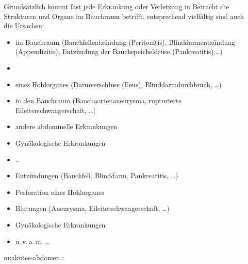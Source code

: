 {%
Grundsätzlich kommt fast jede Erkrankung oder Verletzung in
Betracht die Strukturen und Organe im Bauchraum betrifft,
entsprechend vielfältig sind auch die Ursachen: 
\begin{itemize}
  \item {} im Bauchraum (Bauchfellentzündung
  (Peritonitis), Blinddarmentzündung (Appendizitis),
  Entzündung der Bauchspeicheldrüse  (Pankreatitis),\ldots)
  \item {}
  \item {} eines Hohlorganes
  (Darmverschluss (Ileus), Blinddarmdurchbruch, \ldots)
  \item {} in den Bauchraum
  (Bauchaortenaneurysma, rupturierte Eileiterschwangerschaft, \ldots)
  \item andere abdominelle Erkrankungen
  \item Gynäkologische Erkrankungen
  \item \ldots
\end{itemize}
}{
\begin{itemize}
  \item Entzündungen (Bauchfell, Blinddarm, Pankreatitis,
  \ldots)
  \item Perforation eines Hohlorganes
  \item Blutungen (Aneurysma, Eileiterschwangerschaft,
  \ldots)
  \item Gynäkologische Erkrankungen
  \item u.\,v.\,a.\,m. \ldots
\end{itemize}
}{}{}{}



{m:akutes-abdomen}{
: 
}{}

